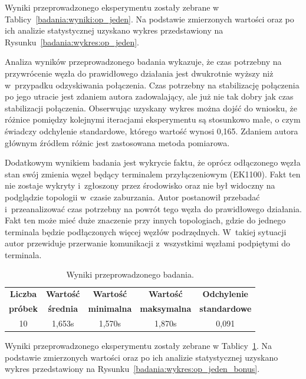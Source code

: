 \noindent Wyniki przeprowadzonego eksperymentu zostały zebrane w Tablicy~\ref{badania:wyniki:op_jeden}. Na podstawie zmierzonych wartości oraz po ich analizie statystycznej uzyskano wykres przedstawiony na Rysunku~\ref{badania:wykres:op_jeden}.


Analiza wyników przeprowadzonego badania wykazuje, że czas potrzebny na przywrócenie węzła do prawidłowego działania jest dwukrotnie wyższy niż w~przypadku odzyskiwania połączenia. Czas potrzebny na stabilizację połączenia po jego utracie jest zdaniem autora zadowalający, ale już nie tak dobry jak czas stabilizacji połączenia. Obserwując uzyskany wykres można dojść do wniosku, że różnice pomiędzy kolejnymi iteracjami eksperymentu są stosunkowo małe, o czym świadczy odchylenie standardowe, którego wartość wynosi 0,165. Zdaniem autora głównym źródłem różnic jest zastosowana metoda pomiarowa.

Dodatkowym wynikiem badania jest wykrycie faktu, że oprócz odłączonego węzła stan swój zmienia węzeł będący terminalem przyłączeniowym (EK1100). Fakt ten nie zostaje wykryty i~zgłoszony przez środowisko oraz nie był widoczny na podglądzie topologii w~czasie zaburzania. Autor postanowił przebadać i~przeanalizować czas potrzebny na powrót tego węzła do prawidłowego działania. Fakt ten może mieć duże znaczenie przy innych topologiach, gdzie do jednego terminala będzie podłączonych więcej węzłów podrzędnych. W~takiej sytuacji autor przewiduje przerwanie komunikacji z~wszystkimi węzłami podpiętymi do terminala.

\begin{table}[!htb]
\begin{center}
\begin{tabular}{| c | c | c | c | c |}\hline
\textbf{Liczba} & \textbf{Wartość} & \textbf{Wartość} & \textbf{Wartość} & \textbf{Odchylenie} \\
\textbf{próbek} & \textbf{średnia} & \textbf{minimalna} & \textbf{maksymalna} & \textbf{standardowe} \\\hline\hline
10 & 1,653s & 1,570s & 1,870s & 0,091\\\hline
\end{tabular}
\end{center}
\vspace*{-6mm}
  \caption{Wyniki przeprowadzonego badania.}
	\label{badania:wyniki:op_jeden_bonus}
\end{table}

\noindent Wyniki przeprowadzonego eksperymentu zostały zebrane w Tablicy~\ref{badania:wyniki:op_jeden_bonus}. Na podstawie zmierzonych wartości oraz po ich analizie statystycznej uzyskano wykres przedstawiony na Rysunku~\ref{badania:wykres:op_jeden_bonus}.


